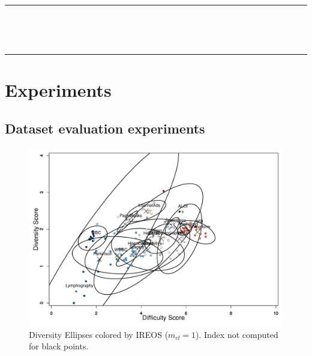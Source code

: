 \documentclass[11pt]{article}
\newcommand{\horrule}[1]{\rule{\linewidth}{#1}} %
\begin{document}
\smallskip

\normalfont \normalsize 
\horrule{0.5pt} \\[0.4cm] %
{ \\ %
\horrule{2pt} %

\linespread{1.5}
\justify

\section{Experiments}

\subsection{Dataset evaluation experiments}
\begin{figure}[h!]
\center
\includegraphics[width=\textwidth]{figs/ellipse_1.pdf}
\captionsetup{justification=centering}
\caption{Diversity Ellipses colored by IREOS ($m_{cl} = 1$). Index not computed for black points.}
\label{fig:DiversityEllipses_1}
\end{figure}
\newpage

}
\end{document}
